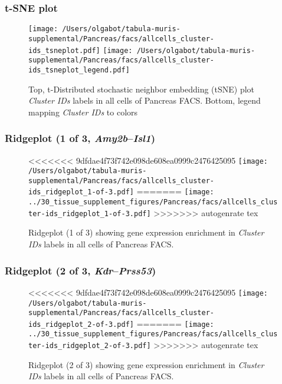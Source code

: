 \clearpage
\subsubsection{t-SNE plot}
\begin{figure}[h]
\centering
\texttt{[image: /Users/olgabot/tabula-muris-supplemental/Pancreas/facs/allcells\_cluster-ids\_tsneplot.pdf]}
\texttt{[image: /Users/olgabot/tabula-muris-supplemental/Pancreas/facs/allcells\_cluster-ids\_tsneplot\_legend.pdf]}
\caption{Top, t-Distributed stochastic neighbor embedding (tSNE) plot  \emph{Cluster IDs} labels in all cells of Pancreas FACS. Bottom, legend mapping \emph{Cluster IDs} to colors}
\end{figure}


\clearpage

\subsubsection{Ridgeplot (1 of 3, \emph{Amy2b}--\emph{Isl1})}
\begin{figure}[h]
\centering
<<<<<<< 9dfdae4f73f742e098de608ea0999c2476425095
\texttt{[image: /Users/olgabot/tabula-muris-supplemental/Pancreas/facs/allcells\_cluster-ids\_ridgeplot\_1-of-3.pdf]}
=======
\texttt{[image: ../30\_tissue\_supplement\_figures/Pancreas/facs/allcells\_cluster-ids\_ridgeplot\_1-of-3.pdf]}
>>>>>>> autogenrate tex

\caption{ Ridgeplot (1 of 3)  showing gene expression enrichment in \emph{Cluster IDs} labels in all cells of Pancreas FACS. }
\end{figure}


\clearpage

\subsubsection{Ridgeplot (2 of 3, \emph{Kdr}--\emph{Prss53})}
\begin{figure}[h]
\centering
<<<<<<< 9dfdae4f73f742e098de608ea0999c2476425095
\texttt{[image: /Users/olgabot/tabula-muris-supplemental/Pancreas/facs/allcells\_cluster-ids\_ridgeplot\_2-of-3.pdf]}
=======
\texttt{[image: ../30\_tissue\_supplement\_figures/Pancreas/facs/allcells\_cluster-ids\_ridgeplot\_2-of-3.pdf]}
>>>>>>> autogenrate tex

\caption{ Ridgeplot (2 of 3)  showing gene expression enrichment in \emph{Cluster IDs} labels in all cells of Pancreas FACS. }
\end{figure}



